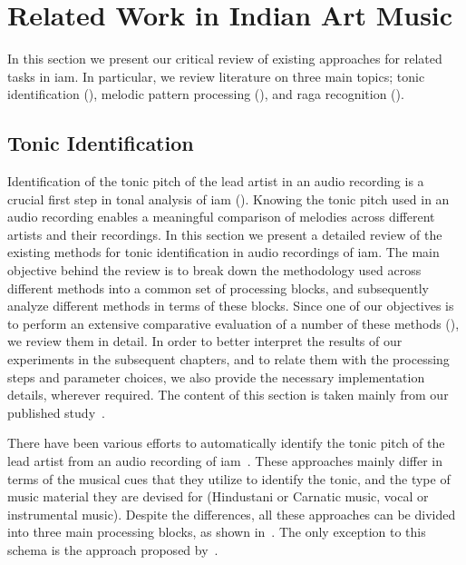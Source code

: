 \section{Related Work in Indian Art Music}
\label{sec:background_relevant_work_iam}

In this section we present our critical review of existing approaches for related tasks in \gls{iam}. In particular, we review literature on three main topics; tonic identification (), melodic pattern processing (), and  \gls{raga} recognition ().  


\subsection{Tonic Identification}
\label{sec:background_relevant_work_tonic_identification}

Identification of the tonic pitch of the lead artist in an audio recording is a crucial first step in tonal analysis of \gls{iam} (). Knowing the tonic pitch used in an audio recording enables a meaningful comparison of melodies across different artists and their recordings. In this section we present a detailed review of the existing methods for tonic identification in audio recordings of \gls{iam}. The main objective behind the review is to break down the methodology used across different methods into a common set of processing blocks, and subsequently analyze different methods in terms of these blocks. Since one of our objectives is to perform an extensive comparative evaluation of a number of these methods (), we review them in detail. In order to better interpret the results of our experiments in the subsequent chapters, and to relate them with the processing steps and parameter choices, we also provide the necessary implementation details, wherever required. The content of this section is taken mainly from our published study~\citep{Gulati2014Tonic}.

There have been various efforts to automatically identify the tonic pitch of the lead artist from an audio recording of \gls{iam}~\citep{salamon2012multipitch,gulati2012two,bellur2012knowledge,ranjani2011carnatic,Sengupta2005b,chordia2013joint}. These approaches mainly differ in terms of the musical cues that they utilize to identify the tonic, and the type of music material they are devised for (Hindustani or Carnatic music, vocal or
instrumental music). Despite the differences, all these approaches can be divided into three main processing blocks, as shown in~. The only exception to this schema is the approach proposed by~\cite{Sengupta2005b}. 

